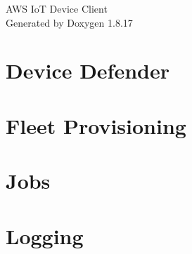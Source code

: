 \let\mypdfximage\pdfximage\def\pdfximage{\immediate\mypdfximage}\documentclass[twoside]{book}
\newcommand{\+}{\discretionary{\mbox{\scriptsize$\hookleftarrow$}}{}{}}
\newcommand{\clearemptydoublepage}{%
  \newpage{\pagestyle{empty}\cleardoublepage}%
}
\begin{document}
\hypersetup{pageanchor=false,
             bookmarksnumbered=true,
             pdfencoding=unicode
            }
\begin{titlepage}
\vspace*{7cm}
\begin{center}%
{\Large A\+WS IoT Device Client }\\
\vspace*{1cm}
{\large Generated by Doxygen 1.8.17}\\
\end{center}
\end{titlepage}
\clearemptydoublepage
{}
\tableofcontents
\clearemptydoublepage
{}
\hypersetup{pageanchor=true}

\chapter{Device Defender}
\label{md__home_runner_work_aws-iot-device-client_aws-iot-device-client_source_devicedefender__r_e_a_d_m_e}

\chapter{Fleet Provisioning}
\label{md__home_runner_work_aws-iot-device-client_aws-iot-device-client_source_fleetprovisioning__r_e_a_d_m_e}

\chapter{Jobs}
\label{md__home_runner_work_aws-iot-device-client_aws-iot-device-client_source_jobs__r_e_a_d_m_e}

\chapter{Logging}
\label{md__home_runner_work_aws-iot-device-client_aws-iot-device-client_source_logging__r_e_a_d_m_e}

\end{document}
